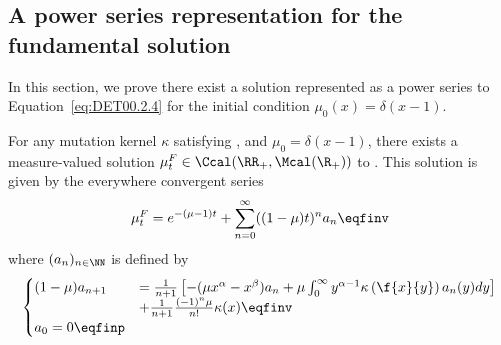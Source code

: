 \subsection{A power series representation for the fundamental solution}
In this section, we prove there exist a solution represented as a power series to Equation~\eqref{eq:DET00.2.4} for the initial condition $\mu_0(x) = \delta(x-1)$.\\

\begin{theorem}
    For any mutation kernel $\kappa$ satisfying , and $\mu_0 = \delta(x-1)$, there exists a measure-valued solution $\mu_t^F \in \Ccal(\RR_+, \Mcal(\R_+))$ to . This solution is given by the everywhere convergent series
    \begin{align}
        \mu_t^F 
        = 
        e^{-(\mu-1)t} + \sum_{n = 0}^\infty ((1-\mu) t)^n a_n
        \eqfinv
    \end{align}
where $(a_n)_{n \in \NN}$ is defined by 
\begin{align*}
    \begin{cases}
    (1-\mu) a_{n+1} 
    &= \frac{1}{n+1}\left[ -(\mu x^{\alpha} - x^\beta) a_n + \mu \int_0^\infty y^{\alpha-1} \kappa \left( \f{x}{y}\right) a_n(y) dy \right] \\
    &+ \frac{1}{n+1} \frac{(-1)^n \mu }{n!}\kappa(x) 
    \eqfinv \\
    a_0 = 0 \eqfinp
    \end{cases}
\end{align*}
\end{theorem}

